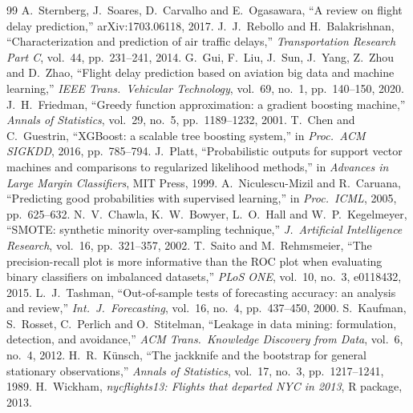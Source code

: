 \documentclass[conference]{IEEEtran}
\begin{document}
\begin{thebibliography}{99}\footnotesize
{} A.~Sternberg, J.~Soares, D.~Carvalho and E.~Ogasawara, ``A review on flight delay prediction,'' arXiv:1703.06118, 2017.
 J.~J.~Rebollo and H.~Balakrishnan, ``Characterization and prediction of air traffic delays,'' \emph{Transportation Research Part C}, vol.~44, pp.~231--241, 2014.
 G.~Gui, F.~Liu, J.~Sun, J.~Yang, Z.~Zhou and D.~Zhao, ``Flight delay prediction based on aviation big data and machine learning,'' \emph{IEEE Trans.\ Vehicular Technology}, vol.~69, no.~1, pp.~140--150, 2020.
 J.~H.~Friedman, ``Greedy function approximation: a gradient boosting machine,'' \emph{Annals of Statistics}, vol.~29, no.~5, pp.~1189--1232, 2001.
 T.~Chen and C.~Guestrin, ``XGBoost: a scalable tree boosting system,'' in \emph{Proc.\ ACM SIGKDD}, 2016, pp.~785--794.
 J.~Platt, ``Probabilistic outputs for support vector machines and comparisons to regularized likelihood methods,'' in \emph{Advances in Large Margin Classifiers}, MIT Press, 1999.
 A.~Niculescu-Mizil and R.~Caruana, ``Predicting good probabilities with supervised learning,'' in \emph{Proc.\ ICML}, 2005, pp.~625--632.
 N.~V.~Chawla, K.~W.~Bowyer, L.~O.~Hall and W.~P.~Kegelmeyer, ``SMOTE: synthetic minority over-sampling technique,'' \emph{J.\ Artificial Intelligence Research}, vol.~16, pp.~321--357, 2002.
 T.~Saito and M.~Rehmsmeier, ``The precision-recall plot is more informative than the ROC plot when evaluating binary classifiers on imbalanced datasets,'' \emph{PLoS ONE}, vol.~10, no.~3, e0118432, 2015.
 L.~J.~Tashman, ``Out-of-sample tests of forecasting accuracy: an analysis and review,'' \emph{Int.\ J.\ Forecasting}, vol.~16, no.~4, pp.~437--450, 2000.
 S.~Kaufman, S.~Rosset, C.~Perlich and O.~Stitelman, ``Leakage in data mining: formulation, detection, and avoidance,'' \emph{ACM Trans.\ Knowledge Discovery from Data}, vol.~6, no.~4, 2012.
 H.~R.~K\"unsch, ``The jackknife and the bootstrap for general stationary observations,'' \emph{Annals of Statistics}, vol.~17, no.~3, pp.~1217--1241, 1989.
 H.~Wickham, \emph{nycflights13: Flights that departed NYC in 2013}, R package, 2013.
\end{thebibliography}

\onecolumn
\end{document}

